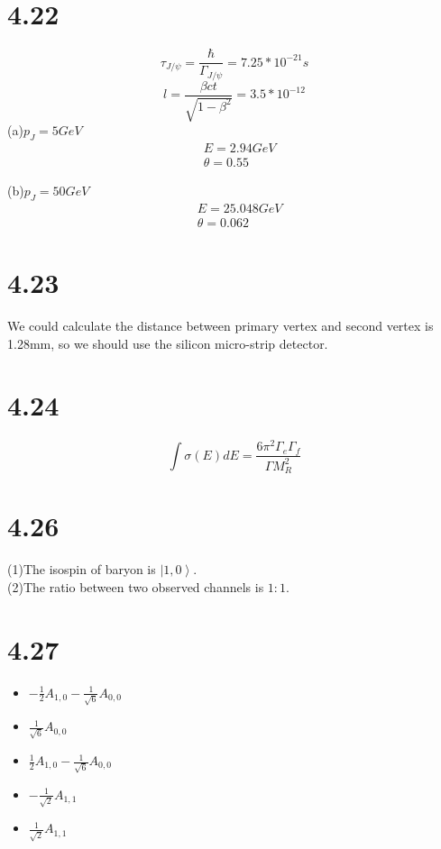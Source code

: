 \documentclass{article}
\begin{document}
\begin{CJK*}{GBK}{song}
\section{4.22}
\begin{equation}
\tau_{J/\psi}=\frac{\hbar}{\Gamma_{J/\psi}}=7.25*10^{-21}s
\end{equation}
\begin{equation}
l=\frac{\beta ct}{\sqrt{1-\beta^2}}=3.5*10^{-12}
\end{equation}
(a)$p_J=5GeV$
\begin{equation}
\begin{aligned}
&E=2.94GeV\\
& \theta=0.55
\end{aligned}
\end{equation}


(b)$p_J=50GeV$
\begin{equation}
\begin{aligned}
&E=25.048GeV\\
& \theta=0.062
\end{aligned}
\end{equation}

\section{4.23}
We could calculate the distance between primary vertex and second vertex is 1.28mm, so we should use the silicon micro-strip detector.
\section{4.24}
\begin{equation}
\int\sigma(E)dE=\frac{6\pi^2\Gamma_e\Gamma_f}{\Gamma M_R^2}
\end{equation}

\section{4.26}
(1)The isospin of baryon is $\left|1,0\right\rangle$.\\
(2)The ratio between two observed channels is $1:1$.

\section{4.27}
\begin{itemize}
\item $-\frac{1}{2}A_{1,0}-\frac{1}{\sqrt{6}}A_{0,0}$
\item $\frac{1}{\sqrt{6}}A_{0,0}$
\item $\frac{1}{2}A_{1,0}-\frac{1}{\sqrt{6}}A_{0,0}$
\item $-\frac{1}{\sqrt{2}}A_{1,1}$
\item $\frac{1}{\sqrt{2}}A_{1,1}$
\end{itemize}


\end{CJK*}
\end{document}
